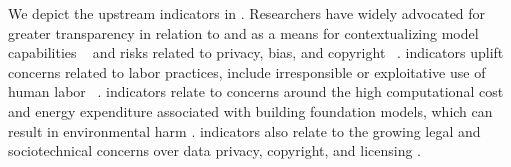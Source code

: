 \noindent We depict the upstream indicators in .
Researchers have widely advocated for greater transparency in relation to \data and \dataaccess \citep{bender-friedman-2018-data, gebru2018datasheets, hutchinson2021towards, dodge2021c4, bandy2021addressing} as a means for contextualizing model capabilities ~\citep{sambasivan2021everyone, longpre2023pretrainer} and risks related to privacy, bias, and copyright ~\citep{buolamwini2018gender,bender2021dangers, kandpal2022deduplicating,sobel2017artificial}.
\labor indicators uplift concerns related to labor practices, include irresponsible or exploitative use of human labor ~\citep{gray2019ghost, crawford2021atlas, hao2023cleaning, kittur2013future, dzieza2023ai, west2019data}.
\compute indicators relate to concerns around the high computational cost and energy expenditure associated with building foundation models, which can result in environmental harm \citep{lacoste2019quantifying,strubell2019energy,schwartz2020green,patterson2021carbon,bender2021dangers,henderson2020towards,luccioni2023counting,vipra2023comments}.
\datamitigations indicators also relate to the growing legal and sociotechnical concerns over data privacy, copyright, and licensing \citep{henderson2023foundation, brown2022does, lee2023talkin,genlaw2023,tremblay2023openai}.


